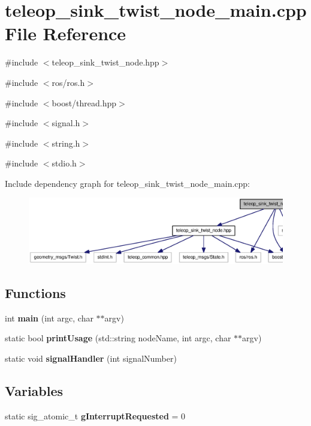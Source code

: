 \section{teleop\_\-sink\_\-twist\_\-node\_\-main.cpp File Reference}
\label{teleop__sink__twist__node__main_8cpp}
{\ttfamily \#include $<$teleop\_\-sink\_\-twist\_\-node.hpp$>$}\par
{\ttfamily \#include $<$ros/ros.h$>$}\par
{\ttfamily \#include $<$boost/thread.hpp$>$}\par
{\ttfamily \#include $<$signal.h$>$}\par
{\ttfamily \#include $<$string.h$>$}\par
{\ttfamily \#include $<$stdio.h$>$}\par
Include dependency graph for teleop\_\-sink\_\-twist\_\-node\_\-main.cpp:
\nopagebreak
\begin{figure}[H]
\begin{center}
\leavevmode
\includegraphics[width=400pt]{teleop__sink__twist__node__main_8cpp__incl}
\end{center}
\end{figure}
\subsection*{Functions}
\begin{DoxyCompactItemize}
\item 
int {\bf main} (int argc, char $\ast$$\ast$argv)
\item 
static bool {\bf printUsage} (std::string nodeName, int argc, char $\ast$$\ast$argv)
\item 
static void {\bf signalHandler} (int signalNumber)
\end{DoxyCompactItemize}
\subsection*{Variables}
\begin{DoxyCompactItemize}
\item 
static sig\_\-atomic\_\-t {\bf gInterruptRequested} = 0
\end{DoxyCompactItemize}


